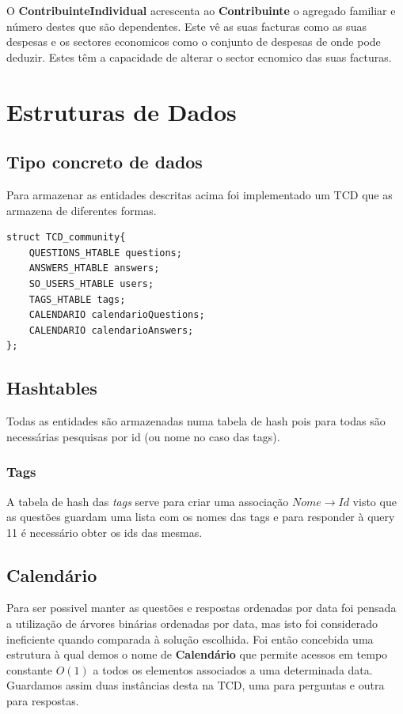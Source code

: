 \documentclass[10pt,a4paper]{article}
\begin{document}
    O \textbf{ContribuinteIndividual} acrescenta ao \textbf{Contribuinte}
    o agregado familiar e número destes que são dependentes. Este vê as suas
    facturas como as suas despesas e os sectores economicos como o conjunto
    de despesas de onde pode deduzir. Estes têm a capacidade de alterar o
    sector ecnomico das suas facturas.

\section{Estruturas de Dados}
    \subsection{Tipo concreto de dados}
    Para armazenar as entidades descritas acima foi implementado um TCD que
    as armazena de diferentes formas.
    \begin{verbatim}
struct TCD_community{
    QUESTIONS_HTABLE questions;
    ANSWERS_HTABLE answers;
    SO_USERS_HTABLE users;
    TAGS_HTABLE tags;
    CALENDARIO calendarioQuestions;
    CALENDARIO calendarioAnswers;
};
    \end{verbatim}
    \subsection{Hashtables}
        Todas as entidades são armazenadas numa tabela de hash pois para todas
        são necessárias pesquisas por id (ou nome no caso das tags).

        \subsubsection{Tags}
        A tabela de hash das \textit{tags} serve para criar uma associação
        $Nome \to Id$ visto que as questões guardam uma lista com os nomes das
        tags e para responder à query 11 é necessário obter os ids das mesmas.

    \subsection{Calendário}
        Para ser possivel manter as questões e respostas ordenadas por data
        foi pensada a utilização de árvores binárias ordenadas por data,
        mas isto foi considerado ineficiente quando comparada à solução
        escolhida. Foi então concebida uma estrutura à qual demos o nome
        de \textbf{Calendário} que permite acessos em tempo constante $O(1)$
        a todos os elementos associados a uma determinada data. Guardamos assim
        duas instâncias desta na TCD, uma para perguntas e outra para respostas.
\end{document}
